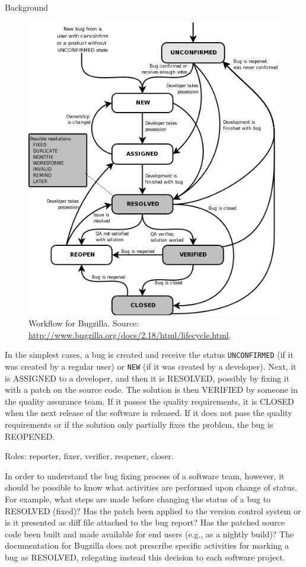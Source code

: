 \begin{section}{Background}
\begin{figure}[ht]
	\centering
		\includegraphics[scale=0.4]{bugzilla.png}
	\caption{Workflow for Bugzilla. Source: \url{http://www.bugzilla.org/docs/2.18/html/lifecycle.html}.}
	\label{fig:bugzilla}
\end{figure}

In the simplest cases, a bug is created and receive the status \texttt{UNCONFIRMED} (if it was created by a regular user) or \texttt{NEW} (if it was created by a developer). Next, it is ASSIGNED to a developer, and then it is RESOLVED, possibly by fixing it with a patch on the source code. The solution is then VERIFIED by someone in the quality assurance team. If it passes the quality requirements, it is CLOSED when the next release of the software is released. If it does not pass the quality requirements or if the solution only partially fixes the problem, the bug is REOPENED.

\TODO Roles: reporter, fixer, verifier, reopener, closer.

In order to understand the bug fixing process of a software team, however, it should be possible to know what activities are performed upon change of status. For example, what steps are made before changing the status of a bug to RESOLVED (fixed)? Has the patch been applied to the version control system or is it presented as diff file attached to the bug report? Has the patched source code been built and made available for end users (e.g., as a nightly build)? The documentation for Bugzilla does not prescribe specific activities for marking a bug as RESOLVED, relegating instead this decision to each software project.


\end{section}
